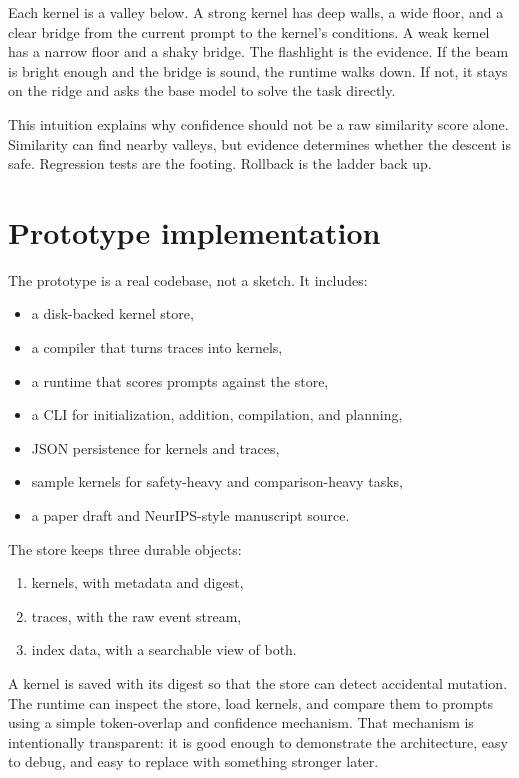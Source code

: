 \documentclass{article}
\begin{document}
Each kernel is a valley below. A strong kernel has deep walls, a wide floor, and a clear bridge from the current prompt to the kernel’s conditions. A weak kernel has a narrow floor and a shaky bridge. The flashlight is the evidence. If the beam is bright enough and the bridge is sound, the runtime walks down. If not, it stays on the ridge and asks the base model to solve the task directly.

This intuition explains why confidence should not be a raw similarity score alone. Similarity can find nearby valleys, but evidence determines whether the descent is safe. Regression tests are the footing. Rollback is the ladder back up.

\section{Prototype implementation}

The prototype is a real codebase, not a sketch. It includes:
\begin{itemize}[leftmargin=1.2em]
\item a disk-backed kernel store,
\item a compiler that turns traces into kernels,
\item a runtime that scores prompts against the store,
\item a CLI for initialization, addition, compilation, and planning,
\item JSON persistence for kernels and traces,
\item sample kernels for safety-heavy and comparison-heavy tasks,
\item a paper draft and NeurIPS-style manuscript source.
\end{itemize}

The store keeps three durable objects:
\begin{enumerate}[leftmargin=1.2em]
\item kernels, with metadata and digest,
\item traces, with the raw event stream,
\item index data, with a searchable view of both.
\end{enumerate}

A kernel is saved with its digest so that the store can detect accidental mutation. The runtime can inspect the store, load kernels, and compare them to prompts using a simple token-overlap and confidence mechanism. That mechanism is intentionally transparent: it is good enough to demonstrate the architecture, easy to debug, and easy to replace with something stronger later.
\end{document}
